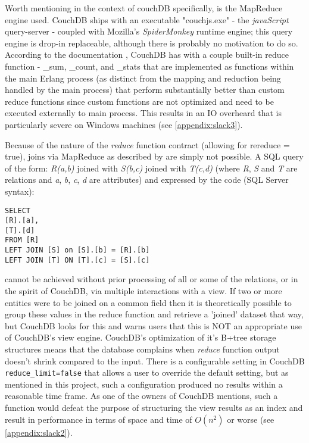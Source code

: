 Worth mentioning in the context of couchDB specifically, is the MapReduce engine used. CouchDB ships with an executable "couchjs.exe" - the \textit{javaScript} query-server - coupled with Mozilla's \textit{SpiderMonkey} runtime engine; this query engine is drop-in replaceable, although there is probably no motivation to do so. According to the documentation \cite{builtincouchreduce}, CouchDB has with a couple built-in reduce function - \_sum, \_count, and \_stats that are implemented as functions within the main Erlang process (as distinct from the mapping and reduction being handled by the main process) that perform substantially better than custom reduce functions since custom functions are not optimized and need to be executed externally to main process. This results in an I\/O overheard that is particularly severe on Windows machines (see \ref{appendix:slack3}).

Because of the nature of the \textit{reduce} function contract (allowing for rereduce = true), joins via MapReduce as described by \cite{chandar2010} are simply not possible. A SQL query of the form: \textit{R(a,b)} joined with \textit{S(b,c)} joined with \textit{T(c,d)} (where \textit{R}, \textit{S} and \textit{T} are relations and \textit{a}, \textit{b}, \textit{c}, \textit{d} are attributes) and expressed by the code (SQL Server syntax):

\begin{verbatim}
SELECT
[R].[a],
[T].[d]
FROM [R]
LEFT JOIN [S] on [S].[b] = [R].[b]
LEFT JOIN [T] ON [T].[c] = [S].[c]
\end{verbatim}

cannot be achieved without prior processing of all or some of the relations, or in the spirit of CouchDB, via multiple interactions with a view. If two or more entities were to be joined on a common field then it is theoretically possible to group these values in the reduce function and retrieve a 'joined' dataset that way, but CouchDB looks for this and warns users that this is NOT an appropriate use of CouchDB's view engine. CouchDB's optimization of it's B+tree storage structures means that the database complains when \textit{reduce} function output doesn't shrink compared to the input. There is a configurable setting in CouchDB \texttt{reduce_limit=false} that allows a user to override the default setting, but as mentioned in this project, such a configuration produced no results within a reasonable time frame. As one of the owners of CouchDB mentions, such a function would defeat the purpose of structuring the view results as an index and result in performance in terms of space and time of $ O(n^2) $ or worse (see \ref{appendix:slack2}).